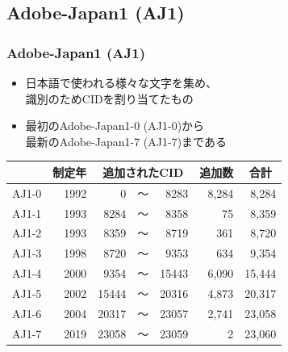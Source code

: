 \subsection{Adobe-Japan1 (AJ1)}
\begin{frame}\frametitle{Adobe-Japan1 (AJ1)}
  \begin{itemize}
  \item 日本語で使われる様々な文字を集め、 \\
    識別のためCIDを割り当てたもの
  \item 最初のAdobe-Japan1-0 (AJ1-0)から \\
    最新のAdobe-Japan1-7 (AJ1-7)まである
  \end{itemize}

  \begin{center}
    \scriptsize
  \begin{tabular}{l|r|rcr|r|r}
    & \multicolumn{1}{c|}{制定年}
    & \multicolumn{3}{c|}{追加されたCID}
    & \multicolumn{1}{c|}{追加数}
    & \multicolumn{1}{c}{合計} \\
    \hline
    AJ1-0 & 1992 &     0 & ～ &  8283 & 8,284 &  8,284 \\
    AJ1-1 & 1993 &  8284 & ～ &  8358 &    75 &  8,359 \\
    AJ1-2 & 1993 &  8359 & ～ &  8719 &   361 &  8,720 \\
    AJ1-3 & 1998 &  8720 & ～ &  9353 &   634 &  9,354 \\
    AJ1-4 & 2000 &  9354 & ～ & 15443 & 6,090 & 15,444 \\
    AJ1-5 & 2002 & 15444 & ～ & 20316 & 4,873 & 20,317 \\
    AJ1-6 & 2004 & 20317 & ～ & 23057 & 2,741 & 23,058 \\
    AJ1-7 & 2019 & 23058 & ～ & 23059 &     2 & 23,060
  \end{tabular}
  \end{center}
\end{frame}

